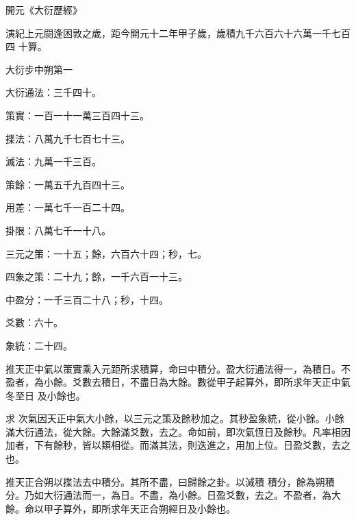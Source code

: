 
\begin{pinyinscope}

 開元《大衍歷經》



 演紀上元閼逢困敦之歲，距今開元十二年甲子歲，歲積九千六百六十六萬一千七百四
 十算。



 大衍步中朔第一



 大衍通法：三千四十。



 策實：一百一十一萬三百四十三。



 揲法：八萬九千七百七十三。



 滅法：九萬一千三百。



 策餘：一萬五千九百四十三。



 用差：一萬七千一百二十四。



 掛限：八萬七千一十八。



 三元之策：一十五；餘，六百六十四；秒，七。



 四象之策：二十九；餘，一千六百一十三。



 中盈分：一千三百二十八；秒，十四。



 爻數：六十。



 象統：二十四。



 推天正中氣以策實乘入元距所求積算，命曰中積分。盈大衍通法得一，為積日。不盈者，為小餘。爻數去積日，不盡日為大餘。數從甲子起算外，即所求年天正中氣冬至日
 及小餘也。



 求
 次氣因天正中氣大小餘，以三元之策及餘秒加之。其秒盈象統，從小餘。小餘滿大衍通法，從大餘。大餘滿爻數，去之。命如前，即次氣恆日及餘秒。凡率相因加者，下有餘秒，皆以類相從。而滿其法，則迭進之，用加上位。日盈爻數，去之也。



 推天正合朔以揲法去中積分。其所不盡，曰歸餘之卦。以減積
 積分，餘為朔積分。乃如大衍通法而一，為日。不盡，為小餘。日盈爻數，去之。不盈者，為大餘。命以甲子算外，即所求年天正合朔經日及小餘也。




\end{pinyinscope}
